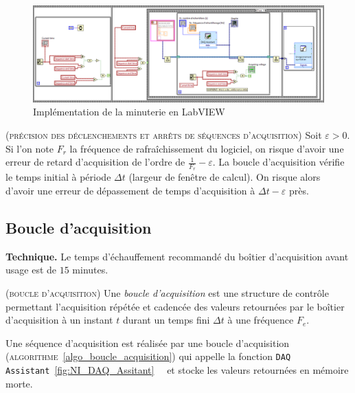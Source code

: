 \documentclass[twocolumn,pre,floats,aps,amsmath,amssymb]{revtex4}
\newenvironment{definition}[1][D\'efinition.]{\begin{trivlist}
\item[\hskip \labelsep {\bfseries #1}]}{\end{trivlist}}
\newenvironment{remark}[1][Remarque.]{\begin{trivlist}
\item[\hskip \labelsep {\bfseries #1}]}{\end{trivlist}}
\begin{document}
\begin{figure}[]
  \includegraphics[width=17.5cm]{minuterie.png}
\caption{Impl\'ementation de la minuterie en LabVIEW}
\label{fig:algo_timer_labview}
\end{figure}

\begin{remark}
  \textsc{(pr\'ecision des d\'eclenchements et arr\^ets de s\'equences d'acquisition)}
  Soit $\varepsilon > 0$.
  Si l'on note $F_r$ la fr\'equence de rafra\^ichissement du logiciel, on risque d'avoir une erreur de retard d'acquisition de l'ordre de $\frac{1}{F_r} - \varepsilon$. La boucle d'acquisition v\'erifie le temps initial \`a p\'eriode $\Delta t$ (largeur de fen\^etre de calcul). On risque alors d'avoir une erreur de d\'epassement de temps d'acquisition \`a $\Delta t - \varepsilon$ pr\`es. 
\end{remark}

\subsection{Boucle d'acquisition}

\noindent
\textbf{Technique.} Le temps d'\'echauffement recommand\'e du bo\^itier d'acquisition avant usage est de $15$ minutes\cite{NI_6353_datasheet}.

\begin{definition}
  (\textsc{boucle d'acquisition})
  Une \textit{boucle d'acquisition} est une structure de contr\^ole permettant l'acquisition r\'ep\'et\'ee et cadenc\'ee des valeurs retourn\'ees par le bo\^itier d'acquisition \`a un instant $t$ durant un temps fini $\Delta t$ \`a une fr\'equence $F_e$.
\end{definition}

Une s\'equence d'acquisition est r\'ealis\'ee par une boucle d'acquisition (\textsc{algorithme}~\ref{algo_boucle_acquisition}) qui appelle la fonction \texttt{DAQ Assistant}~\ref{fig:NI_DAQ_Assitant}~\cite{NI_acquisition_design_ref}~\cite{NI_Dynamic_data} et stocke les valeurs retourn\'ees en m\'emoire morte.
\end{document}
